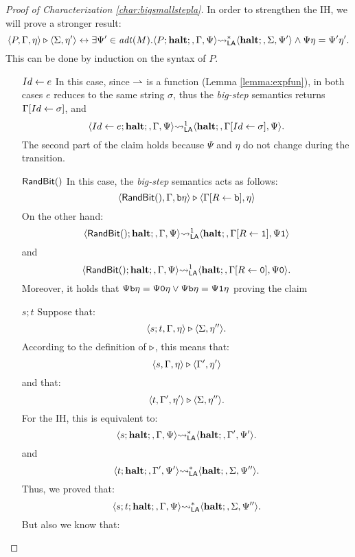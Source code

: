 \begin{proof}[Proof of Characterization \ref{char:bigsmallstepla}]
  In order to strengthen the IH, we will prove a stronger result:
  $$
  \langle P, \Gamma, \eta\rangle \triangleright \langle \Sigma, \eta'\rangle \leftrightarrow  \exists \Psi' \in \mathit{adt}(M).\langle P;\mathbf{halt};, \Gamma, \Psi\rangle {\leadsto_{\mathsf{LA}}^{*}}  \langle \mathbf{halt};, \Sigma, \Psi'\rangle \land \Psi\eta = \Psi'\eta'.
  $$
  This can be done by induction on the syntax of $P$.
  \begin{itemize}
    \item[$Id \leftarrow e$] In this case, since $\rightharpoonup$ is a function (Lemma \ref{lemma:expfun}),
    in both cases $e$ reduces to the same string $\sigma$, thus the \emph{big-step} semantics
    returns $\Gamma [Id \leftarrow \sigma]$, and
    $$
    \langle Id \leftarrow e; \mathbf{halt};, \Gamma, \Psi\rangle {\leadsto_{\mathsf{LA}}^{1}}  \langle \mathbf{halt};, \Gamma [Id \leftarrow \sigma],\Psi\rangle.
    $$
    The second part of the claim holds because $\Psi$ and $\eta$ do not change during the transition.
    \item[$\mathsf{RandBit()}$] In this case, the \emph{big-step} semantics acts as follows:
    $$
      \langle \mathsf{RandBit()}, \Gamma, \mathtt{b}\eta\rangle \triangleright \langle \Gamma[R \leftarrow \mathtt{b}], \eta\rangle
    $$
    On the other hand:
    $$
    \langle \mathsf{RandBit()}; \mathbf{halt};, \Gamma, \Psi\rangle {\leadsto_{\mathsf{LA}}^{1}}  \langle \mathbf{halt};, \Gamma [R \leftarrow \mathtt{1}],\Psi\mathtt{1}\rangle
    $$
    and
    $$
    \langle \mathsf{RandBit()}; \mathbf{halt};, \Gamma, \Psi\rangle {\leadsto_{\mathsf{LA}}^{1}}  \langle \mathbf{halt};, \Gamma [R \leftarrow \mathtt{0}],\Psi\mathtt{0}\rangle.
    $$
    Moreover, it holds that $\Psi\mathtt{b}\eta=\Psi\mathtt{0}\eta \lor \Psi\mathtt{b}\eta=\Psi\mathtt{1}\eta$ proving the claim
    \item[$s;t$] Suppose that:
    $$
    \langle s;t, \Gamma, \eta\rangle \triangleright \langle \Sigma, \eta''\rangle.
    $$
    According to the definition of $\triangleright$, this means that:
    $$
    \langle s, \Gamma, \eta\rangle \triangleright \langle \Gamma', \eta'\rangle
    $$
    and that:
    $$
    \langle t, \Gamma', \eta'\rangle \triangleright \langle \Sigma, \eta''\rangle.
    $$
    For the IH, this is equivalent to:
    $$
    \langle s;\mathbf{halt};, \Gamma, \Psi\rangle {\leadsto_{\mathsf{LA}}^{*}} \langle \mathbf{halt};, \Gamma', \Psi'\rangle .
    $$
    and
    $$
    \langle t;\mathbf{halt};, \Gamma', \Psi'\rangle {\leadsto_{\mathsf{LA}}^{*}} \langle \mathbf{halt};, \Sigma, \Psi''\rangle .
    $$
    Thus, we proved that:
    $$
    \langle s;t;\mathbf{halt};, \Gamma, \Psi\rangle {\leadsto_{\mathsf{LA}}^{*}} \langle \mathbf{halt};, \Sigma, \Psi''\rangle.
    $$
    But also we know that:

\end{itemize}
\end{proof}
